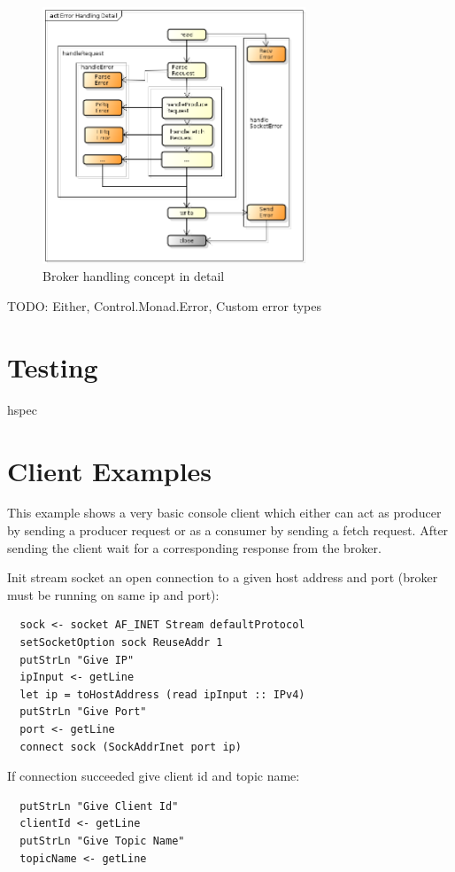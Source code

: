 \begin{figure}[H]
    \centering
    \includegraphics[width=0.7\textwidth]{images/broker-error-activity-detail.png}
    \caption{Broker handling concept in detail}
    \label{fig:broker-error-activity-detail.png}
\end{figure}

TODO: Either, Control.Monad.Error, Custom error types

\section{Testing}
hspec 

\section{Client Examples}
This example shows a very basic console client which either can act as producer
by sending a producer request or as a consumer by sending a fetch request. After
sending the client wait for a corresponding response from the broker.

Init stream socket an open connection to a given host address and port (broker must be running on same ip and port): 
\begin{lstlisting}
  sock <- socket AF_INET Stream defaultProtocol 
  setSocketOption sock ReuseAddr 1
  putStrLn "Give IP"
  ipInput <- getLine
  let ip = toHostAddress (read ipInput :: IPv4)
  putStrLn "Give Port"
  port <- getLine
  connect sock (SockAddrInet port ip)
\end{lstlisting}

If connection succeeded give client id and topic name: 
\begin{lstlisting}
  putStrLn "Give Client Id"
  clientId <- getLine
  putStrLn "Give Topic Name"
  topicName <- getLine
\end{lstlisting}

